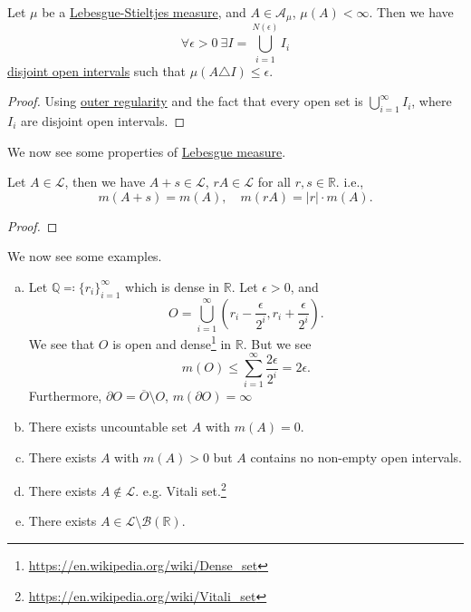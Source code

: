 \begin{proposition}
	Let \(\mu \) be a \hyperref[def:Lebesgue-Stieltjes-measure]{Lebesgue-Stieltjes measure}, and \(A\in \mathcal{A} _\mu \), \(\mu (A)<\infty \). Then we have
	\[
		\forall \epsilon >0\ \exists I = \bigcup_{i=1}^{N(\epsilon )} I_{i}
	\]
	\underline{disjoint open intervals} such that \(\mu (A\triangle  I)\leq \epsilon \).
\end{proposition}
\begin{proof}
	Using \hyperref[thm:outer-regularity]{outer regularity} and the fact that every open set is \(\bigcup_{i=1}^{\infty} I_{i}\), where \(I_{i}\) are disjoint open intervals.
\end{proof}

We now see some properties of \hyperref[def:Lebesgue-measure]{Lebesgue measure}.

\begin{theorem}
	Let \(A\in \mathcal{L}\), then we have \(A + s\in \mathcal{L}\), \(rA\in\mathcal{L}  \) for all \(r, s\in\mathbb{R} \). i.e.,
	\[
		m(A+s) = m(A),\quad m(rA) = \left\vert r \right\vert \cdot m(A).
	\]
\end{theorem}
\begin{proof}
\end{proof}

\begin{eg}
	We now see some examples.
	\begin{enumerate}[(a)]
		\item Let \(\mathbb{Q}\eqqcolon\{r_{i}\}_{i=1}^{\infty}\) which is dense in \(\mathbb{R} \). Let \(\epsilon >0\), and
		      \[
			      O = \bigcup_{i=1}^{\infty} \left(r_{i} - \frac{\epsilon}{2^i}, r_{i} + \frac{\epsilon}{2^i}\right).
		      \]
		      We see that \(O\) is open and dense\footnote{\url{https://en.wikipedia.org/wiki/Dense_set}} in \(\mathbb{R} \). But we see
		      \[
			      m(O) \leq \sum_{i=1}^{\infty} \frac{2\epsilon }{2^i} = 2\epsilon.
		      \]
		      Furthermore, \(\partial O = \overline{O} \setminus O\), \(m(\partial O) = \infty \)
		\item There exists uncountable set \(A\) with \(m(A)=0\).
		\item There exists \(A\) with \(m(A)>0\) but \(A\) contains no non-empty open intervals.
		\item There exists \(A\notin \mathcal{L} \). e.g. Vitali set.\footnote{\url{https://en.wikipedia.org/wiki/Vitali_set}}
		\item There exists \(A\in\mathcal{L} \setminus \mathcal{B} (\mathbb{R} )\).
	\end{enumerate}
\end{eg}